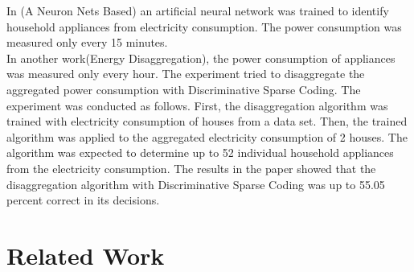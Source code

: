 In (A Neuron Nets Based) an artificial neural network was trained to identify household appliances from electricity consumption. The power consumption was measured only every 15 minutes.\\%
In another work(Energy Disaggregation), the power consumption of appliances was measured only every hour. The experiment tried to disaggregate the aggregated power consumption with Discriminative Sparse Coding. The experiment was conducted as follows. First, the disaggregation algorithm was trained with electricity consumption of houses from a data set. Then, the trained algorithm was applied to the aggregated electricity consumption of 2 houses. The algorithm was expected to determine up to 52 individual household appliances from the electricity consumption. The results in the paper showed that the disaggregation algorithm with Discriminative Sparse Coding was up to 55.05 percent correct in its decisions.

\section{Related Work}
